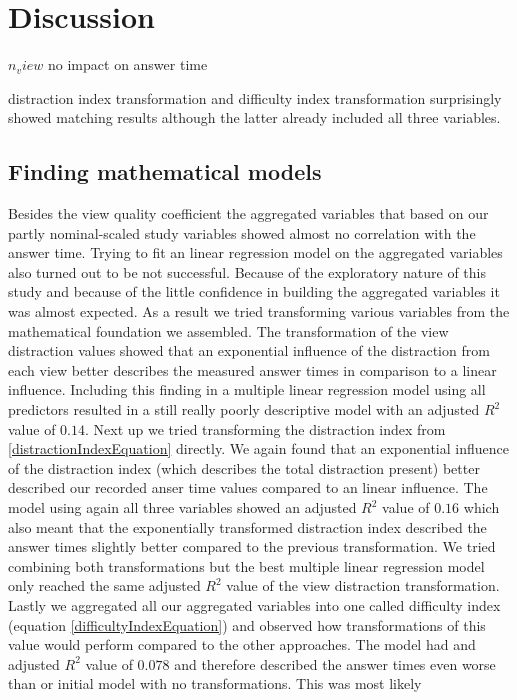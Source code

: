 \chapter{Discussion}
$n_view$ no impact on answer time


distraction index transformation and difficulty index transformation surprisingly showed matching results although the latter already
included all three variables.

\section{Finding mathematical models}
Besides the view quality coefficient the aggregated variables that based on our partly nominal-scaled study variables showed almost no correlation with
the answer time. Trying to fit an linear regression model on the aggregated variables also turned out to be not successful. Because of the exploratory nature
of this study and because of the little confidence in building the aggregated variables it was almost expected. As a result we tried transforming various variables
from the mathematical foundation we assembled. The transformation of the view distraction values showed that an exponential influence of the distraction from each view
better describes the measured answer times in comparison to a linear influence. Including this finding in a multiple linear regression model using all predictors
resulted in a still really poorly descriptive model with an adjusted $R^2$ value of $0.14$. Next up we tried transforming the distraction index from \ref{distractionIndexEquation}
directly. We again found that an exponential influence of the distraction index (which describes the total distraction present) better described our recorded
anser time values compared to an linear influence. The model using again all three variables showed an adjusted $R^2$ value of $0.16$ which also meant that the exponentially
transformed distraction index described the answer times slightly better compared to the previous transformation. We tried combining both transformations but the best
multiple linear regression model only reached the same adjusted $R^2$ value of the view distraction transformation. Lastly we aggregated all our aggregated variables
into one called difficulty index (equation \ref{difficultyIndexEquation}) and observed how transformations of this value would perform compared to the other approaches.
The model had and adjusted $R^2$ value of $0.078$ and therefore described the answer times even worse than or initial model with no transformations. This was most likely
